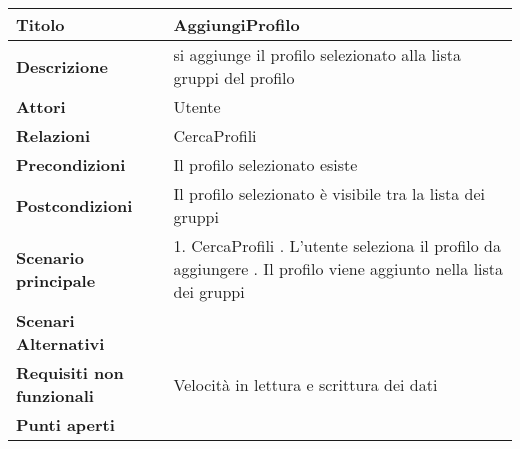 \begin{tabular} {|P{4.5cm}|P{11cm}|}
  \hline
  \textbf{Titolo}                   & AggiungiProfilo                                                  \\
  \hline
  \textbf{Descrizione}              & si aggiunge il profilo selezionato alla lista gruppi del profilo \\
  \hline
  \textbf{Attori}                   & Utente                                                           \\
  \hline
  \textbf{Relazioni}                & CercaProfili                                                     \\
  \hline
  \textbf{Precondizioni}            & Il profilo selezionato esiste                                    \\
  \hline
  \textbf{Postcondizioni}           & Il profilo selezionato è visibile tra la lista dei gruppi        \\
  \hline
  \textbf{Scenario principale}      & 1. CercaProfili . L'utente seleziona il profilo da aggiungere . Il profilo viene aggiunto nella lista dei gruppi\linebreak                                        \\
  \hline
  \textbf{Scenari Alternativi}      &                                                                  \\
  \hline
  \textbf{Requisiti non funzionali} & Velocità in lettura e scrittura dei dati                         \\
  \hline
  \textbf{Punti aperti}             &                                                                  \\
  \hline
\end{tabular}
\hfill
\break

